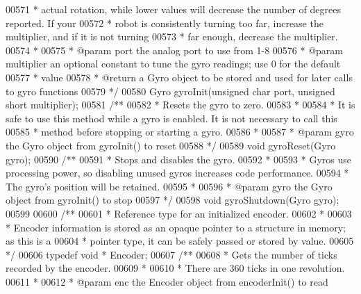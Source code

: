 \begin{DoxyCode}
00571 \textcolor{comment}{ * actual rotation, while lower values will decrease the number of degrees reported. If your}
00572 \textcolor{comment}{ * robot is consistently turning too far, increase the multiplier, and if it is not turning}
00573 \textcolor{comment}{ * far enough, decrease the multiplier.}
00574 \textcolor{comment}{ *}
00575 \textcolor{comment}{ * @param port the analog port to use from 1-8}
00576 \textcolor{comment}{ * @param multiplier an optional constant to tune the gyro readings; use 0 for the default}
00577 \textcolor{comment}{ * value}
00578 \textcolor{comment}{ * @return a Gyro object to be stored and used for later calls to gyro functions}
00579 \textcolor{comment}{ */}
00580 Gyro gyroInit(\textcolor{keywordtype}{unsigned} \textcolor{keywordtype}{char} port, \textcolor{keywordtype}{unsigned} \textcolor{keywordtype}{short} multiplier);
00581 \textcolor{comment}{/**}
00582 \textcolor{comment}{ * Resets the gyro to zero.}
00583 \textcolor{comment}{ *}
00584 \textcolor{comment}{ * It is safe to use this method while a gyro is enabled. It is not necessary to call this}
00585 \textcolor{comment}{ * method before stopping or starting a gyro.}
00586 \textcolor{comment}{ *}
00587 \textcolor{comment}{ * @param gyro the Gyro object from gyroInit() to reset}
00588 \textcolor{comment}{ */}
00589 \textcolor{keywordtype}{void} gyroReset(Gyro gyro);
00590 \textcolor{comment}{/**}
00591 \textcolor{comment}{ * Stops and disables the gyro.}
00592 \textcolor{comment}{ *}
00593 \textcolor{comment}{ * Gyros use processing power, so disabling unused gyros increases code performance.}
00594 \textcolor{comment}{ * The gyro's position will be retained.}
00595 \textcolor{comment}{ *}
00596 \textcolor{comment}{ * @param gyro the Gyro object from gyroInit() to stop}
00597 \textcolor{comment}{ */}
00598 \textcolor{keywordtype}{void} gyroShutdown(Gyro gyro);
00599 
00600 \textcolor{comment}{/**}
00601 \textcolor{comment}{ * Reference type for an initialized encoder.}
00602 \textcolor{comment}{ *}
00603 \textcolor{comment}{ * Encoder information is stored as an opaque pointer to a structure in memory; as this is a}
00604 \textcolor{comment}{ * pointer type, it can be safely passed or stored by value.}
00605 \textcolor{comment}{ */}
00606 \textcolor{keyword}{typedef} \textcolor{keywordtype}{void} * Encoder;
00607 \textcolor{comment}{/**}
00608 \textcolor{comment}{ * Gets the number of ticks recorded by the encoder.}
00609 \textcolor{comment}{ *}
00610 \textcolor{comment}{ * There are 360 ticks in one revolution.}
00611 \textcolor{comment}{ *}
00612 \textcolor{comment}{ * @param enc the Encoder object from encoderInit() to read}

\end{DoxyCode}
